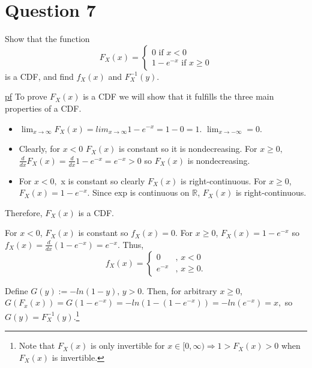 \documentclass[11pt]{article} %
\begin{document}
\section{Question 7}
Show that the function
\begin{equation*}
F_X(x) = 
\begin{cases}
0 \text{ if $x <0$} \\
1 - e^{-x} \text{ if $x\geq 0$}
\end{cases}
\end{equation*}
is a CDF, and find $f_X(x)$ and $F_{X}^{-1}(y)$.

\underline{pf} To prove $F_X(x)$ is a CDF we will show that it fulfills the three main properties of a CDF.
\begin{itemize}
\item $\lim_{x \rightarrow \infty}F_X(x) = lim_{x \rightarrow \infty} 1 - e^{-x} = 1 - 0 =1.$ $\lim_{x \rightarrow -\infty} = 0.$
\item Clearly, for $x<0$ $F_X(x)$ is constant so it is nondecreasing. For $x \geq 0,$ $\frac{d}{dx} F_X(x) = \frac{d}{dx} 1 - e^{-x} = e^{-x} > 0$ so $F_X(x)$ is nondecreasing. 
\item For $x<0,$ x is constant so clearly $F_X(x)$ is right-continuous. For $x \geq 0$, $F_X(x) = 1 - e^{-x}$. Since exp is continuous on $\mathbb{R}$, $F_X(x)$ is right-continuous.
\end{itemize}
Therefore, $F_X(x)$ is a CDF.

For $x<0$, $F_X(x)$ is constant so $f_X(x)=0$. For $x\geq 0$, $F_X(x) = 1 - e^{-x}$ so $f_X(x) = \frac{d}{dx} \left(1 - e^{-x} \right) = e^{-x}$. Thus, 
\begin{equation*}
f_X(x) = 
\begin{cases}
0 &\text{, $x<0$} \\
e^{-x} &\text{, $x\geq 0$}.
\end{cases}
\end{equation*}

Define $G(y) := %
- ln(1-y) \text{, $y>0$}
$. Then, for arbitrary $x \geq 0$, $G(F_x(x)) = G(1 - e^{-x}) = -ln(1-(1-e^{-x})) = -ln(e^{-x}) = x,$ so $G(y) = F_{X}^{-1}(y)$.\footnote{Note that $F_X(x)$ is only invertible for $x \in [0,\infty ) \Rightarrow 1>F_X(x) > 0$ when $F_X(x)$ is invertible.}
\end{document}

